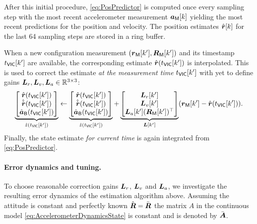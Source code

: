 After this initial procedure, \eqref{eq:PosPredictor} is computed once every sampling step with the most recent accelerometer measurement $\boldsymbol{a}_{\mathsf{M}}[k]$ yielding the most recent predictions for the position and velocity.
The position estimates $\hat{\boldsymbol{r}}[k]$ for the last 64 sampling steps are stored in a ring buffer.

When a new configuration measurement $(\boldsymbol{r}_{\mathsf{M}}[k'], \boldsymbol{R}_{\mathsf{M}}[k'])$ and its timestamp $t_{\mathsf{VIC}}[k']$ are available, the corresponding estimate $\hat{\boldsymbol{r}}(t_{\mathsf{VIC}}[k'])$ is interpolated.
This is used to correct the estimate \textit{at the measurement time} $t_{\mathsf{VIC}}[k']$ with yet to define gains $\boldsymbol{L}_r, \boldsymbol{L}_v, \boldsymbol{L}_a \in \mathbb{R}^{3\times3}$:
\begin{align}\label{eq:PosCorrector}
 \underbrace{\begin{bmatrix} \hat{\boldsymbol{r}}(t_{\mathsf{VIC}}[k']) \\ \hat{\dot{\boldsymbol{r}}}(t_{\mathsf{VIC}}[k']) \\ \hat{\boldsymbol{a}}_{\mathsf{B}}(t_{\mathsf{VIC}}[k']) \end{bmatrix}}_{\hat{z}(t_{\mathsf{VIC}}[k'])}
 \leftarrow 
 \underbrace{\begin{bmatrix} \hat{\boldsymbol{r}}(t_{\mathsf{VIC}}[k']) \\ \hat{\dot{\boldsymbol{r}}}(t_{\mathsf{VIC}}[k']) \\ \hat{\boldsymbol{a}}_{\mathsf{B}}(t_{\mathsf{VIC}}[k']) \end{bmatrix}}_{\hat{z}(t_{\mathsf{VIC}}[k'])}
 +
 \underbrace{\begin{bmatrix} \boldsymbol{L}_r[k'] \\ \boldsymbol{L}_v[k'] \\ \boldsymbol{L}_a[k'] (\boldsymbol{R}_{\mathsf{M}}[k'])^\top \end{bmatrix}}_{\boldsymbol{L}[k']}
 (\boldsymbol{r}_{\mathsf{M}}[k'] - \hat{\boldsymbol{r}}(t_{\mathsf{VIC}}[k'])).
\end{align}
Finally, the state estimate \textit{for current time} is again integrated from \eqref{eq:PosPredictor}.


\paragraph{Error dynamics and tuning.}
To choose reasonable correction gains $\boldsymbol{L}_r$, $\boldsymbol{L}_v$ and $\boldsymbol{L}_a$, we investigate the resulting error dynamics of the estimation algorithm above.
Assuming the attitude is constant and perfectly known $\hat{\boldsymbol{R}} = \bar{\boldsymbol{R}}$ the matrix $A$ in the continuous model \eqref{eq:AccelerometerDynamicsState} is constant and is denoted by $\bar{\boldsymbol{A}}$.

